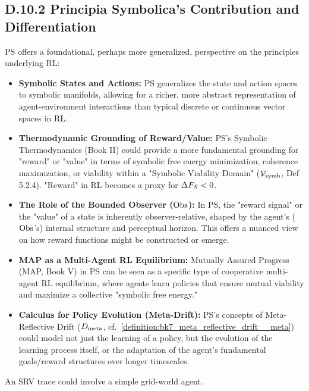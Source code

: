 \subsection*{D.10.2 Principia Symbolica's Contribution and Differentiation} \label{subsec:appD_rl_contribution_differentiation}
PS offers a foundational, perhaps more generalized, perspective on the principles underlying RL:
\begin{itemize}
    \item \textbf{Symbolic States and Actions:} PS generalizes the state and action spaces to symbolic manifolds, allowing for a richer, more abstract representation of agent-environment interactions than typical discrete or continuous vector spaces in RL.
    \item \textbf{Thermodynamic Grounding of Reward/Value:} PS's Symbolic Thermodynamics (Book II) could provide a more fundamental grounding for "reward" or "value" in terms of symbolic free energy minimization, coherence maximization, or viability within a "Symbolic Viability Domain" (\(\mathcal{V}_{\mathrm{symb}}\), Def 5.2.4). "Reward" in RL becomes a proxy for \(\Delta F_S < 0\).
    \item \textbf{The Role of the Bounded Observer (\(\mathrm{Obs}\)):} In PS, the "reward signal" or the "value" of a state is inherently observer-relative, shaped by the agent's (\(\mathrm{Obs}\)'s) internal structure and perceptual horizon. This offers a nuanced view on how reward functions might be constructed or emerge.
    \item \textbf{MAP as a Multi-Agent RL Equilibrium:} Mutually Assured Progress (MAP, Book V) in PS can be seen as a specific type of cooperative multi-agent RL equilibrium, where agents learn policies that ensure mutual viability and maximize a collective "symbolic free energy."
    \item \textbf{Calculus for Policy Evolution (Meta-Drift):} PS's concepts of Meta-Reflective Drift (\(D_{\mathrm{meta}}\), cf.~\ref{definition:bk7_meta_reflective_drift__meta}) could model not just the learning of a policy, but the evolution of the learning process itself, or the adaptation of the agent's fundamental goals/reward structures over longer timescales.
\end{itemize}
An SRV trace could involve a simple grid-world agent.
